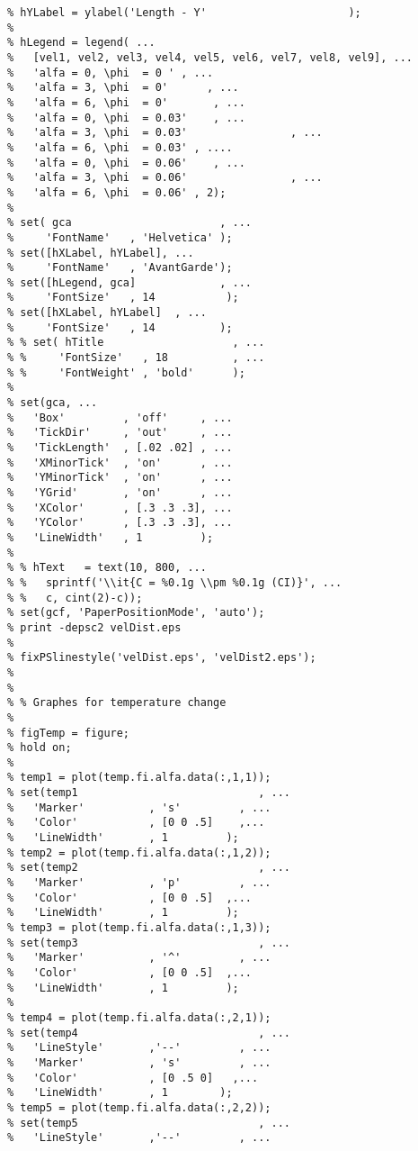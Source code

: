 \begin{lstlisting}
% hYLabel = ylabel('Length - Y'                      );
% 
% hLegend = legend( ...
%   [vel1, vel2, vel3, vel4, vel5, vel6, vel7, vel8, vel9], ...
%   'alfa = 0, \phi  = 0 ' , ...
%   'alfa = 3, \phi  = 0'      , ...
%   'alfa = 6, \phi  = 0'       , ...
%   'alfa = 0, \phi  = 0.03'    , ...
%   'alfa = 3, \phi  = 0.03'                , ...
%   'alfa = 6, \phi  = 0.03' , ....
%   'alfa = 0, \phi  = 0.06'    , ...
%   'alfa = 3, \phi  = 0.06'                , ...
%   'alfa = 6, \phi  = 0.06' , 2);
% 
% set( gca                       , ...
%     'FontName'   , 'Helvetica' );
% set([hXLabel, hYLabel], ...
%     'FontName'   , 'AvantGarde');
% set([hLegend, gca]             , ...
%     'FontSize'   , 14           );
% set([hXLabel, hYLabel]  , ...
%     'FontSize'   , 14          );
% % set( hTitle                    , ...
% %     'FontSize'   , 18          , ...
% %     'FontWeight' , 'bold'      );
% 
% set(gca, ...
%   'Box'         , 'off'     , ...
%   'TickDir'     , 'out'     , ...
%   'TickLength'  , [.02 .02] , ...
%   'XMinorTick'  , 'on'      , ...
%   'YMinorTick'  , 'on'      , ...
%   'YGrid'       , 'on'      , ...
%   'XColor'      , [.3 .3 .3], ...
%   'YColor'      , [.3 .3 .3], ...
%   'LineWidth'   , 1         );
% 
% % hText   = text(10, 800, ...
% %   sprintf('\\it{C = %0.1g \\pm %0.1g (CI)}', ...
% %   c, cint(2)-c));
% set(gcf, 'PaperPositionMode', 'auto');
% print -depsc2 velDist.eps
% 
% fixPSlinestyle('velDist.eps', 'velDist2.eps');
% 
% 
% % Graphes for temperature change
% 
% figTemp = figure;
% hold on;
% 
% temp1 = plot(temp.fi.alfa.data(:,1,1));
% set(temp1                            , ...
%   'Marker'          , 's'         , ...
%   'Color'           , [0 0 .5]    ,...
%   'LineWidth'       , 1         );
% temp2 = plot(temp.fi.alfa.data(:,1,2));
% set(temp2                            , ...
%   'Marker'          , 'p'         , ...
%   'Color'           , [0 0 .5]  ,...
%   'LineWidth'       , 1         );
% temp3 = plot(temp.fi.alfa.data(:,1,3));
% set(temp3                            , ...
%   'Marker'          , '^'         , ...
%   'Color'           , [0 0 .5]  ,...
%   'LineWidth'       , 1         );
% 
% temp4 = plot(temp.fi.alfa.data(:,2,1));
% set(temp4                            , ...
%   'LineStyle'       ,'--'         , ...
%   'Marker'          , 's'         , ...
%   'Color'           , [0 .5 0]   ,...
%   'LineWidth'       , 1        );
% temp5 = plot(temp.fi.alfa.data(:,2,2));
% set(temp5                            , ...
%   'LineStyle'       ,'--'         , ...

\end{lstlisting}
